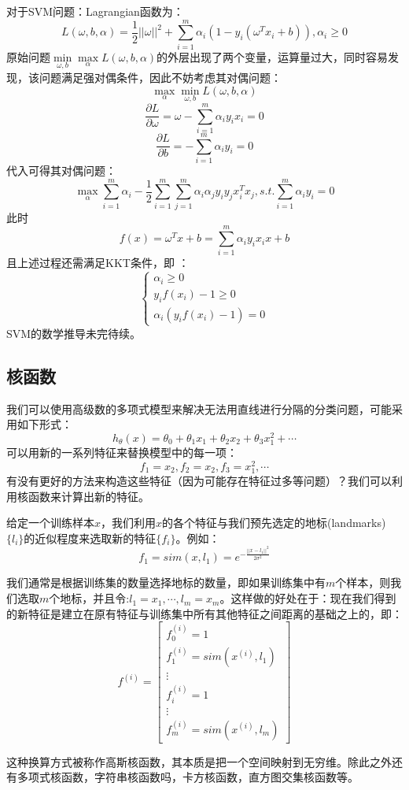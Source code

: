 \documentclass[cn,hazy,blue,normal,14pt]{elegantnote}
\begin{document}
对于SVM问题：Lagrangian函数为：
$$
L(\omega,b,\alpha)=\frac{1}{2}||\omega||^2+\sum_{i=1}^{m}\alpha_i(1-y_i(\omega^Tx_i+b)),\alpha_i \geqslant 0
$$
原始问题$\min\limits_{\omega,b}\max\limits_{\alpha} L(\omega,b,\alpha)$的外层出现了两个变量，运算量过大，同时容易发现，该问题满足强对偶条件，因此不妨考虑其对偶问题：
$$
\max_\alpha \min_{\omega,b} L(\omega,b,\alpha)
$$
$$
\frac{\partial L}{\partial \omega}=\omega-\sum_{i=1}^{m}\alpha_i y_i x_i=0
$$
$$
\frac{\partial L}{\partial b}=-\sum_{i=1}^{m}\alpha_i y_i=0
$$
代入可得其对偶问题：
$$
\max_\alpha \sum_{i=1}^{m}\alpha_i-\frac{1}{2}\sum_{i=1}^{m}\sum_{j=1}^{m}\alpha_i\alpha_jy_iy_jx_i^Tx_j,s.t. \sum_{i=1}^{m}\alpha_iy_i=0
$$
此时
$$
f(x)=\omega^Tx+b=\sum_{i=1}^m \alpha_i y_i x_i x+b
$$
且上述过程还需满足KKT条件，即 ：
$$
\begin{cases}
    \alpha_i \geqslant 0 \\
    y_if(x_i)-1 \geqslant 0 \\
    \alpha_i(y_if(x_i)-1)=0
\end{cases}
$$
SVM的数学推导未完待续。
\subsection{核函数}
我们可以使用高级数的多项式模型来解决无法用直线进行分隔的分类问题，可能采用如下形式：
$$
h_\theta(x)=\theta_0+\theta_1x_1+\theta_2x_2+\theta_3 x_1^2+\cdots
$$
可以用新的一系列特征来替换模型中的每一项：
$$
f_1=x_2,f_2=x_2,f_3=x_1^2,\cdots
$$
有没有更好的方法来构造这些特征（因为可能存在特征过多等问题）？我们可以利用核函数来计算出新的特征。

给定一个训练样本$x$，我们利用$x$的各个特征与我们预先选定的地标(landmarks)$\{l_i\}$的近似程度来选取新的特征$\{f_i\}$。例如：
$$
f_1=sim(x,l_1)=e^{-\frac{||x-l_1||^2}{2\sigma^2}}
$$

我们通常是根据训练集的数量选择地标的数量，即如果训练集中有$m$个样本，则我们选取$m$个地标，并且令:$l_1=x_1,\cdots,l_m=x_m$。这样做的好处在于：现在我们得到的新特征是建立在原有特征与训练集中所有其他特征之间距离的基础之上的，即：
$$
f^{(i)}=\begin{bmatrix}
    f_0^{(i)}=1 \\
    f_1^{(i)}=sim(x^{(i)},l_1) \\
    \vdots \\
    f_i^{(i)}=1 \\
    \vdots \\
    f_m^{(i)}=sim(x^{(i)},l_m)
\end{bmatrix}
$$

这种换算方式被称作高斯核函数，其本质是把一个空间映射到无穷维。除此之外还有多项式核函数，字符串核函数吗，卡方核函数，直方图交集核函数等。
\end{document}
